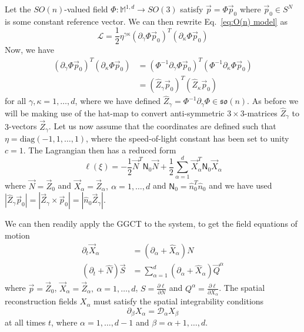 Let the $SO(n)$-valued field $\Phi : \mathbb{M}^{1,d} \to SO(3)$ satisfy $\vec{p} = \Phi \vec{p}_0$ where $\vec{p}_0 \in S^N$ is some constant reference vector. We can then rewrite Eq.~\ref{eq:O(n) model} as
\begin{equation}
\mathcal{L} = \frac{1}{2} \eta^{\gamma \kappa} (\partial_\gamma \Phi \vec{p}_0)^T (\partial_\kappa \Phi  \vec{p}_0) 
\end{equation}
Now, we have
\begin{equation}
\begin{aligned}
(\partial_\gamma \Phi \vec{p}_0)^T (\partial_\kappa \Phi  \vec{p}_0) & = (\Phi^{-1} \partial_\gamma \Phi \vec{p}_0)^T (\Phi^{-1} \partial_\kappa \Phi  \vec{p}_0) \\
& = (\hat{Z}_\gamma \vec{p}_0)^T (\hat{Z}_\kappa \vec{p}_0)
\end{aligned}
\end{equation}
for all $\gamma,\kappa = 1,\dots, d$, where we have defined $\hat{Z}_\gamma = \Phi^{-1} \partial_\gamma \Phi \in \mathfrak{so}(n)$. As before we will  be making use of the hat-map to convert anti-symmetric $3\times 3$-matrices $\hat{Z}_\gamma$ to $3$-vectors $\vec{Z}_\gamma$. Let us now assume that the coordinates are defined such that $\eta = \text{diag}(-1, 1, \dots, 1)$, where the speed-of-light constant has been set to unity $c=1$. The Lagrangian then has a reduced form
\begin{equation}
\ell(\xi) = - \frac{1}{2} \vec{N}^T \mathsf{N}_0 \vec{N} + \frac{1}{2} \sum_{\alpha=1}^d \vec{X}_\alpha^T \mathsf{N}_0 \vec{X}_\alpha
\end{equation}
where $\vec{N} = \vec{Z}_0$ and $\vec{X}_\alpha = \vec{Z}_\alpha,\ \alpha = 1, \dots, d$ and $\mathsf{N}_0 = \hat{n}_0^T \hat{n}_0$ and we have used $|\hat{Z}_\gamma \vec{p}_0 | = |\vec{Z}_\gamma \times  \vec{p}_0 | = | \hat{n}_0 \vec{Z}_\gamma  |$.

We can then readily apply the GGCT to the system, to get the field equations of motion
\begin{subequations} 
\begin{align}
\partial_t \vec{X}_\alpha & = (\partial_\alpha + \hat{X}_\alpha) N \\
(\partial_t + \hat{N}) \vec{S} & = \sum_{\alpha=1}^d (\partial_\alpha + \hat{X}_\alpha) \vec{Q}^\alpha  \label{eq:dynamic field equations}
\end{align}
\end{subequations}
where $\vec{p} = \vec{Z}_0$, $\vec{X}_\alpha = \vec{Z}_\alpha,\ \alpha = 1, \dots, d$, $S = \frac{\partial \ell}{\partial N}$ and $Q^\alpha = \frac{\partial \ell}{\partial X_\alpha}$. The spatial reconstruction fields $X_\alpha$ must satisfy the spatial integrability conditions
\begin{equation}
\partial_\beta X_\alpha = \mathcal{D}_\alpha X_\beta
\end{equation}
at all times $t$, where $\alpha = 1, \dots, d-1$ and $\beta = \alpha+1, \dots, d$.

